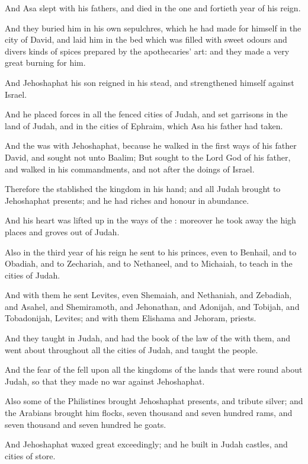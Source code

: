 \Verse And Asa slept with his fathers, and died in the one and fortieth year of his reign.

\Verse And they buried him in his own sepulchres, which he had made for himself in the city of David, and laid him in the bed which was filled with sweet odours and divers kinds of spices prepared by the apothecaries' art: and they made a very great burning for him.


\Chapter
\Verse And Jehoshaphat his son reigned in his stead, and strengthened himself against Israel.

\Verse And he placed forces in all the fenced cities of Judah, and set garrisons in the land of Judah, and in the cities of Ephraim, which Asa his father had taken.

\Verse And the \LORD was with Jehoshaphat, because he walked in the first ways of his father David, and sought not unto Baalim; \Verse But sought to the Lord God of his father, and walked in his commandments, and not after the doings of Israel.

\Verse Therefore the \LORD stablished the kingdom in his hand; and all Judah brought to Jehoshaphat presents; and he had riches and honour in abundance.

\Verse And his heart was lifted up in the ways of the \LORD: moreover he took away the high places and groves out of Judah.

\Verse Also in the third year of his reign he sent to his princes, even to Benhail, and to Obadiah, and to Zechariah, and to Nethaneel, and to Michaiah, to teach in the cities of Judah.

\Verse And with them he sent Levites, even Shemaiah, and Nethaniah, and Zebadiah, and Asahel, and Shemiramoth, and Jehonathan, and Adonijah, and Tobijah, and Tobadonijah, Levites; and with them Elishama and Jehoram, priests.

\Verse And they taught in Judah, and had the book of the law of the \LORD with them, and went about throughout all the cities of Judah, and taught the people.

\Verse And the fear of the \LORD fell upon all the kingdoms of the lands that were round about Judah, so that they made no war against Jehoshaphat.

\Verse Also some of the Philistines brought Jehoshaphat presents, and tribute silver; and the Arabians brought him flocks, seven thousand and seven hundred rams, and seven thousand and seven hundred he goats.

\Verse And Jehoshaphat waxed great exceedingly; and he built in Judah castles, and cities of store.

